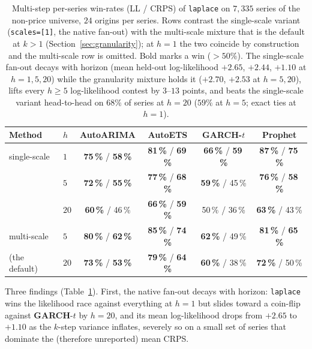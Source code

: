 \documentclass[article]{jss}
\providecommand{\pkg}[1]{\textbf{#1}}
\providecommand{\code}[1]{\texttt{#1}}
\begin{document}
\begin{table}[t!]
\centering
\begin{tabular}{llcccc}
\toprule
Method & $h$ & \pkg{AutoARIMA} & \pkg{AutoETS} & \pkg{GARCH}-$t$ & \pkg{Prophet} \\
\midrule
single-scale       & $1$  & \textbf{75\,\%} / \textbf{58\,\%} & \textbf{81\,\%} / \textbf{69\,\%} & \textbf{66\,\%} / \textbf{59\,\%} & \textbf{87\,\%} / \textbf{75\,\%} \\
                   & $5$  & \textbf{72\,\%} / \textbf{55\,\%} & \textbf{77\,\%} / \textbf{68\,\%} & \textbf{59\,\%} / 45\,\% & \textbf{76\,\%} / \textbf{58\,\%} \\
                   & $20$ & \textbf{60\,\%} / 46\,\%          & \textbf{66\,\%} / \textbf{59\,\%} & 50\,\% / 36\,\%          & \textbf{63\,\%} / 43\,\% \\
\midrule
multi-scale        & $5$  & \textbf{80\,\%} / \textbf{62\,\%} & \textbf{85\,\%} / \textbf{74\,\%} & \textbf{62\,\%} / 49\,\% & \textbf{81\,\%} / \textbf{65\,\%} \\
(the default)      & $20$ & \textbf{73\,\%} / \textbf{53\,\%} & \textbf{79\,\%} / \textbf{64\,\%} & \textbf{60\,\%} / 38\,\% & \textbf{72\,\%} / 50\,\% \\
\bottomrule
\end{tabular}
\caption{Multi-step per-series win-rates (LL / CRPS) of \code{laplace} on
$7{,}335$ series of the non-price universe, $24$ origins per series. Rows
contrast the single-scale variant (\code{scales=[1]}, the native fan-out) with
the multi-scale mixture that is the default at $k>1$
(Section~\ref{sec:granularity}); at $h=1$ the two coincide by construction and
the multi-scale row is omitted. Bold marks a win ($>50\%$). The single-scale
fan-out decays with horizon (mean held-out log-likelihood $+2.65$, $+2.44$,
$+1.10$ at $h = 1, 5, 20$) while the granularity mixture holds it ($+2.70$,
$+2.53$ at $h = 5, 20$), lifts every $h\ge 5$ log-likelihood contest by
$3$--$13$ points, and beats the single-scale variant head-to-head on $68\%$ of
series at $h=20$ ($59\%$ at $h=5$; exact ties at $h=1$).}
\label{tab:multistep}
\end{table}

Three findings (Table~\ref{tab:multistep}). First, the native fan-out decays
with horizon: \code{laplace} wins the likelihood race against everything at
$h=1$ but slides toward a coin-flip against \pkg{GARCH}-$t$ by $h=20$, and its
mean log-likelihood drops from $+2.65$ to $+1.10$ as the $k$-step variance
inflates, severely so on a small set of series that dominate the (therefore
unreported) mean CRPS.
\end{document}
